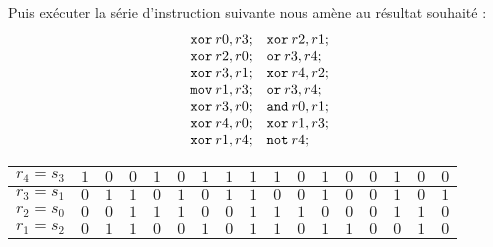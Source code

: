 \documentclass{article}
\begin{document}
Puis exécuter la série d'instruction suivante nous amène au résultat souhaité : 
%
\[
\begin{array}{ll}
\mathtt{xor}\: r0, r3; & \mathtt{xor}\: r2, r1; \\
\mathtt{xor}\: r2, r0; & \mathtt{or}\: r3, r4;  \\
\mathtt{xor}\: r3, r1; & \mathtt{xor}\: r4, r2; \\
\mathtt{mov}\: r1, r3; & \mathtt{or}\: r3, r4; \\
\mathtt{xor}\: r3, r0; & \mathtt{and}\: r0, r1; \\
\mathtt{xor}\: r4, r0; & \mathtt{xor}\: r1, r3; \\
\mathtt{xor}\: r1, r4; & \mathtt{not}\: r4;
\end{array}
\]

\medbreak
\begin{center}
\begin{tabular}{|l|l|l|l|l|l|l|l|l|l|l|l|l|l|l|l|l|}
\hline
\multicolumn{1}{|l|}{$r_{4}=s_{3}$}&	\multicolumn{1}{|l|}{ $1$}&	\multicolumn{1}{|l|}{ $0$}&	\multicolumn{1}{|l|}{ $0$}&	\multicolumn{1}{|l|}{ $1$}&	\multicolumn{1}{|l|}{ $0$}&	\multicolumn{1}{|l|}{ $1$}&	\multicolumn{1}{|l|}{ $1$}&	\multicolumn{1}{|l|}{ $1$}&	\multicolumn{1}{|l|}{ $1$}&	\multicolumn{1}{|l|}{ $0$}&	\multicolumn{1}{|l|}{ $1$}&	\multicolumn{1}{|l|}{ $0$}&	\multicolumn{1}{|l|}{ $0$}&	\multicolumn{1}{|l|}{ $1$}&	\multicolumn{1}{|l|}{ $0$}&	\multicolumn{1}{|l|}{ $0$}	\\
\hline
\multicolumn{1}{|l|}{ $r_{3}=s_{1}$}&	\multicolumn{1}{|l|}{ $0$}&	\multicolumn{1}{|l|}{ $1$}&	\multicolumn{1}{|l|}{ $1$}&	\multicolumn{1}{|l|}{ $0$}&	\multicolumn{1}{|l|}{ $1$}&	\multicolumn{1}{|l|}{ $0$}&	\multicolumn{1}{|l|}{ $1$}&	\multicolumn{1}{|l|}{ $1$}&	\multicolumn{1}{|l|}{ $0$}&	\multicolumn{1}{|l|}{ $0$}&	\multicolumn{1}{|l|}{ $1$}&	\multicolumn{1}{|l|}{ $0$}&	\multicolumn{1}{|l|}{ $0$}&	\multicolumn{1}{|l|}{ $1$}&	\multicolumn{1}{|l|}{ $0$}&	\multicolumn{1}{|l|}{ $1$}	\\
\hline
\multicolumn{1}{|l|}{ $r_{2}=s_{0}$}&	\multicolumn{1}{|l|}{ $0$}&	\multicolumn{1}{|l|}{ $0$}&	\multicolumn{1}{|l|}{ $1$}&	\multicolumn{1}{|l|}{ $1$}&	\multicolumn{1}{|l|}{ $1$}&	\multicolumn{1}{|l|}{ $0$}&	\multicolumn{1}{|l|}{ $0$}&	\multicolumn{1}{|l|}{ $1$}&	\multicolumn{1}{|l|}{ $1$}&	\multicolumn{1}{|l|}{ $1$}&	\multicolumn{1}{|l|}{ $0$}&	\multicolumn{1}{|l|}{ $0$}&	\multicolumn{1}{|l|}{ $0$}&	\multicolumn{1}{|l|}{ $1$}&	\multicolumn{1}{|l|}{ $1$}&	\multicolumn{1}{|l|}{ $0$}	\\
\hline
\multicolumn{1}{|l|}{ $r_{1}=s_{2}$}&	\multicolumn{1}{|l|}{ $0$}&	\multicolumn{1}{|l|}{ $1$}&	\multicolumn{1}{|l|}{ $1$}&	\multicolumn{1}{|l|}{ $0$}&	\multicolumn{1}{|l|}{ $0$}&	\multicolumn{1}{|l|}{ $1$}&	\multicolumn{1}{|l|}{ $0$}&	\multicolumn{1}{|l|}{ $1$}&	\multicolumn{1}{|l|}{ $1$}&	\multicolumn{1}{|l|}{ $0$}&	\multicolumn{1}{|l|}{ $1$}&	\multicolumn{1}{|l|}{ $1$}&	\multicolumn{1}{|l|}{ $0$}&	\multicolumn{1}{|l|}{ $0$}&	\multicolumn{1}{|l|}{ $1$}&	\multicolumn{1}{|l|}{ $0$}	\\

\end{tabular}
\end{center}
\end{document}
